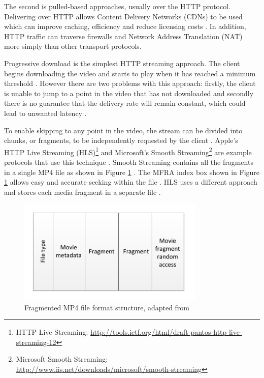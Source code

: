 \documentclass[journal]{IEEEtran}
\begin{document}
The second is pulled-based approaches, usually over the HTTP protocol. Delivering over HTTP allows Content Delivery Networks (CDNs) to be used which can improve caching, efficiency and reduce licensing costs \cite{article:towardsVideoOnTheWebWithHTML5}\cite{inproceedings:HTTPAsTheNarrowWaist}. In addition, HTTP traffic can traverse firewalls and Network Address Translation (NAT) more simply than other transport protocols. %

Progressive download is the simplest HTTP streaming approach. The client begins downloading the video and starts to play when it has reached a minimum threshold \cite{article:watchingVideoOverTheWeb}. However there are two problems with this approach: firstly, the client is unable to jump to a point in the video that has not downloaded and secondly there is no guarantee that the delivery rate will remain constant, which could lead to unwanted latency \cite{article:towardsVideoOnTheWebWithHTML5}. %

To enable skipping to any point in the video, the stream can be divided into chunks, or fragments, to be independently requested by the client \cite{article:areWeInTheMiddleOfAVideoStreamingRevolution}. Apple's HTTP Live Streaming (HLS)\footnote{HTTP Live Streaming: \url{http://tools.ietf.org/html/draft-pantos-http-live-streaming-12}} and Microsoft's Smooth Streaming\footnote{Microsoft Smooth Streaming: \url{http://www.iis.net/downloads/microsoft/smooth-streaming}} are example protocols that use this technique \cite{article:watchingVideoOverTheWeb}. Smooth Streaming contains all the fragments in a single MP4 file as shown in Figure \ref{fig:mp4Structure} \cite{article:watchingVideoOverTheWeb}. The MFRA index box shown in Figure \ref{fig:mp4Structure} allows easy and accurate seeking within the file \cite{website:smoothStreamingArchitecture}. HLS uses a different approach and stores each media fragment in a separate file \cite{article:watchingVideoOverTheWeb}.

\begin{figure}[!t]
\centering
\includegraphics[width=3.5in]{smooth-streaming}
\caption{Fragmented MP4 file format structure, adapted from \cite{website:smoothStreamingArchitecture}}
\label{fig:mp4Structure}
\end{figure} 
\end{document}
